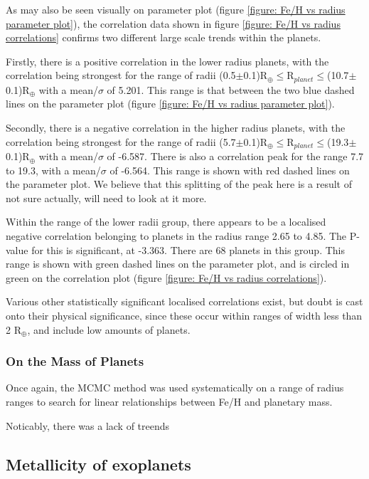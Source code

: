 \documentclass[a4paper,twocolumn,12pt]{article}
\begin{document}
As may also be seen visually on parameter plot (figure \ref{figure: Fe/H vs radius parameter plot}), the correlation data shown in figure \ref{figure: Fe/H vs radius correlations} confirms two different large scale trends within the planets.

Firstly, there is a positive correlation in the lower radius planets, with the correlation being strongest for the range of radii (0.5$\pm$0.1)R$_{\oplus} \leq $R$_{planet} \leq $(10.7$\pm$0.1)R$_{\oplus}$ with a mean/$\sigma$ of 5.201. This range is that between the two blue dashed lines on the parameter plot (figure \ref{figure: Fe/H vs radius parameter plot}).

Secondly, there is a negative correlation in the higher radius planets, with the correlation being strongest for the range of radii (5.7$\pm$0.1)R$_{\oplus} \leq $R$_{planet} \leq $(19.3$\pm$0.1)R$_{\oplus}$ with a mean/$\sigma$ of -6.587. There is also a correlation peak for the range 7.7 to 19.3, with a mean/$\sigma$ of -6.564. This range is shown with red dashed lines on the parameter plot. We believe that this splitting of the peak here is a result of not sure actually, will need to look at it more.

Within the range of the lower radii group, there appears to be a localised negative correlation belonging to planets in the radius range 2.65 to 4.85. The P-value for this is significant, at -3.363. There are 68 planets in this group. This range is shown with green dashed lines on the parameter plot, and is circled in green on the correlation plot (figure \ref{figure: Fe/H vs radius correlations}).

Various other statistically significant localised correlations exist, but doubt is cast onto their physical significance, since these occur within ranges of width less than 2 R$_{\oplus}$, and include low amounts of planets.

\subsubsection{On the Mass of Planets}

Once again, the MCMC method was used systematically on a range of radius ranges to search for linear relationships between Fe/H and planetary mass.

Noticably, there was a lack of treends 

\subsection{Metallicity of exoplanets}





\vspace{-1em}
\footnotesize

\end{document}
